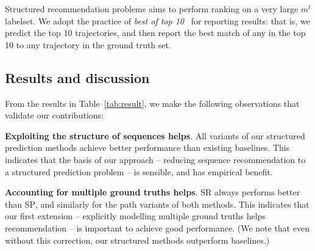 Structured recommendation problems aims to perform ranking on a very large $m^l$ labelset.
We adopt the practice of {\em best of top 10}~\cite{russakovsky2015imagenet} for reporting results:
that is, we predict the top 10 trajectories, and then report the best match of any in the top 10 to any trajectory in the ground truth set.

\secmoveup
\subsection{Results and discussion}
\label{sec:result}
\textmoveup



From the results in Table~\ref{tab:result}, we make the following observations that validate our contributions:

\textbf{Exploiting the structure of sequences helps}.
All variants of our structured prediction methods achieve better performance than existing baselines.
This indicates that the basis of our approach -- reducing sequence recommendation to a structured prediction problem -- is sensible, and has empirical benefit.

\textbf{Accounting for multiple ground truths helps}.
\textsc{SR} always performs better than \textsc{SP},
and similarly for the {\sc path} variants of both methods.
This indicates that our first extension -- explicitly modelling multiple ground truths helps recommendation -- is important to achieve good performance.
(We note that even without this correction, our structured methods outperform baselines.)

